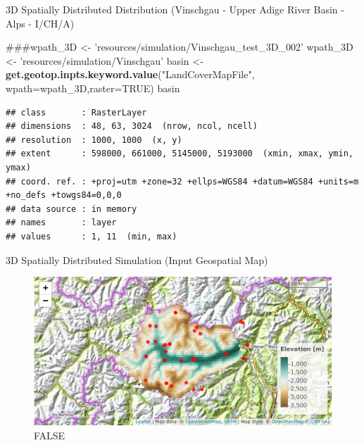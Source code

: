 \documentclass[ignorenonframetext,]{beamer}
\newenvironment{Shaded}{\begin{snugshade}}{\end{snugshade}}
\newcommand{\KeywordTok}[1]{\textcolor[rgb]{0.13,0.29,0.53}{\textbf{#1}}}
\newcommand{\DataTypeTok}[1]{\textcolor[rgb]{0.13,0.29,0.53}{#1}}
\newcommand{\StringTok}[1]{\textcolor[rgb]{0.31,0.60,0.02}{#1}}
\newcommand{\OtherTok}[1]{\textcolor[rgb]{0.56,0.35,0.01}{#1}}
\newcommand{\NormalTok}[1]{#1}
\begin{document}
\begin{frame}[fragile]{3D Spatially Distributed Distribution (Vinschgau
- Upper Adige River Basin - Alps - I/CH/A)}

\begin{Shaded}
\begin{Highlighting}[]
\NormalTok{###wpath_3D <- 'resources/simulation/Vinschgau_test_3D_002'}
\NormalTok{wpath_3D <-}\StringTok{ 'resources/simulation/Vinschgau'}
\NormalTok{basin <-}\StringTok{ }\KeywordTok{get.geotop.inpts.keyword.value}\NormalTok{(}\StringTok{"LandCoverMapFile"}\NormalTok{,}
              \DataTypeTok{wpath=}\NormalTok{wpath_3D,}\DataTypeTok{raster=}\OtherTok{TRUE}\NormalTok{)}
\NormalTok{basin}
\end{Highlighting}
\end{Shaded}

\begin{verbatim}
## class       : RasterLayer 
## dimensions  : 48, 63, 3024  (nrow, ncol, ncell)
## resolution  : 1000, 1000  (x, y)
## extent      : 598000, 661000, 5145000, 5193000  (xmin, xmax, ymin, ymax)
## coord. ref. : +proj=utm +zone=32 +ellps=WGS84 +datum=WGS84 +units=m +no_defs +towgs84=0,0,0 
## data source : in memory
## names       : layer 
## values      : 1, 11  (min, max)
\end{verbatim}

\end{frame}

\begin{frame}{3D Spatially Distributed Simulation (Input Geospatial
Map)}

\begin{figure}
\centering
\includegraphics{presentation_files/figure-beamer/unnamed-chunk-14-1.pdf}
\caption{FALSE}
\end{figure}

\end{frame}
\end{document}
